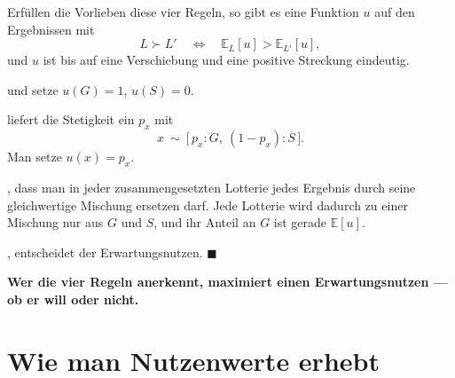 \begin{merksatz}
Erfüllen die Vorlieben diese vier Regeln, so gibt es eine Funktion $u$ auf den Ergebnissen mit
\[ L \succ L' \quad\Longleftrightarrow\quad \mathbb{E}_L[u] > \mathbb{E}_{L'}[u] , \]
und $u$ ist bis auf eine Verschiebung und eine positive Streckung eindeutig.

 und setze $u(G)=1$, $u(S)=0$.

 liefert die Stetigkeit ein $p_x$ mit
\[ x \ \sim\ \bigl[\,p_x: G,\ (1-p_x): S\,\bigr] . \]
Man setze $u(x) = p_x$.

, dass man in jeder zusammengesetzten Lotterie jedes Ergebnis durch seine gleichwertige Mischung ersetzen darf. Jede Lotterie wird dadurch zu einer Mischung nur aus $G$ und $S$, und ihr Anteil an $G$ ist gerade $\mathbb{E}[u]$.

, entscheidet der Erwartungsnutzen. $\blacksquare$

\begin{center}
\begin{minipage}{0.9\textwidth}
\textbf{Wer die vier Regeln anerkennt, maximiert einen Erwartungsnutzen --- ob er will oder nicht.}
\end{minipage}
\end{center}

\begin{center}
\begin{minipage}{0.88\textwidth}
\end{minipage}
\end{center}
\end{merksatz}

\section{Wie man Nutzenwerte erhebt}

